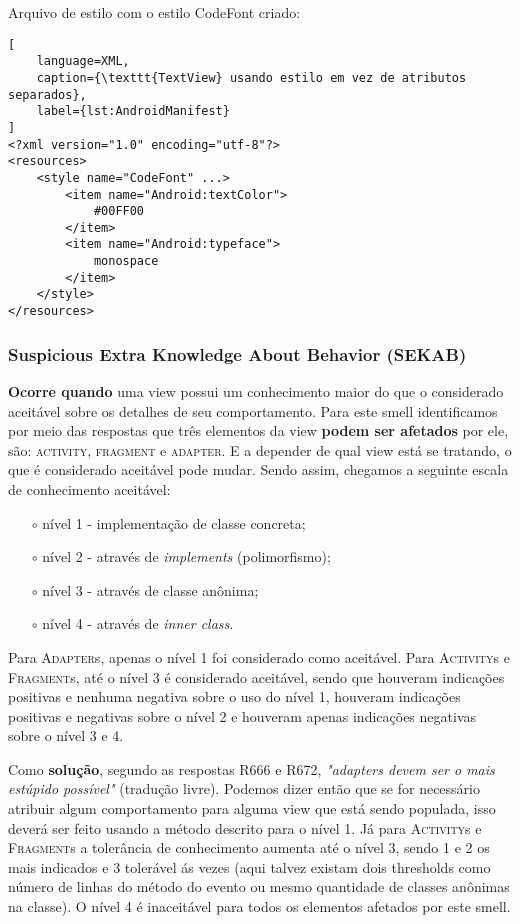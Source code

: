 Arquivo de estilo com o estilo CodeFont criado:

\begin{lstlisting}[
	language=XML, 
	caption={\texttt{TextView} usando estilo em vez de atributos separados}, 
	label={lst:AndroidManifest}
]
<?xml version="1.0" encoding="utf-8"?>
<resources>
    <style name="CodeFont" ...>
        <item name="Android:textColor">
        	#00FF00
        </item>
        <item name="Android:typeface">
        	monospace
        </item>
    </style>
</resources>
\end{lstlisting}


\subsubsection{Suspicious Extra Knowledge About Behavior (SEKAB)}

\textbf{Ocorre quando} uma view possui um conhecimento maior do que o considerado aceit\'avel sobre os detalhes de seu comportamento. Para este smell identificamos por meio das respostas que tr\^es elementos da view \textbf{podem ser afetados} por ele, s\~ao: \textsc{activity}, \textsc{fragment} e \textsc{adapter}. E a depender de qual view est\'a se tratando, o que \'e considerado aceit\'avel pode mudar. Sendo assim, chegamos a seguinte escala de conhecimento aceit\'avel:

\begin{itemize} 
	\item[$\circ$] n\'ivel 1 - implementa\c{c}\~ao de classe concreta;
	\item[$\circ$] n\'ivel 2 - atrav\'es de \textit{implements} (polimorfismo);
	\item[$\circ$] n\'ivel 3 - atrav\'es de classe an\^onima;
	\item[$\circ$] n\'ivel 4 - atrav\'es de \textit{inner class}.
\end{itemize}

Para \textsc{Adapter}s, apenas o n\'ivel 1 foi considerado como aceit\'avel. Para \textsc{Activity}s e \textsc{Fragment}s, at\'e o n\'ivel 3 \'e considerado aceit\'avel, sendo que houveram indica\c{c}\~oes positivas e nenhuma negativa sobre o uso do n\'ivel 1, houveram indica\c{c}\~oes positivas e negativas sobre o n\'ivel 2 e houveram apenas indica\c{c}\~oes negativas sobre o n\'ivel 3 e 4. 

Como \textbf{solu\c{c}\~ao}, segundo as respostas R666 e R672, \textit{"adapters devem ser o mais est\'upido poss\'ivel"} (tradu\c{c}\~ao livre). Podemos dizer ent\~ao que se for necess\'ario atribuir algum comportamento para alguma view que est\'a sendo populada, isso dever\'a ser feito usando a m\'etodo descrito para o n\'ivel 1. J\'a para \textsc{Activity}s e \textsc{Fragment}s a toler\^ancia de conhecimento aumenta at\'e o n\'ivel 3, sendo 1 e 2 os mais indicados e 3 toler\'avel \'as vezes (aqui talvez existam dois thresholds como n\'umero de linhas do m\'etodo do evento ou mesmo quantidade de classes an\^onimas na classe). O n\'ivel 4 \'e inaceit\'avel para todos os elementos afetados por este smell.

